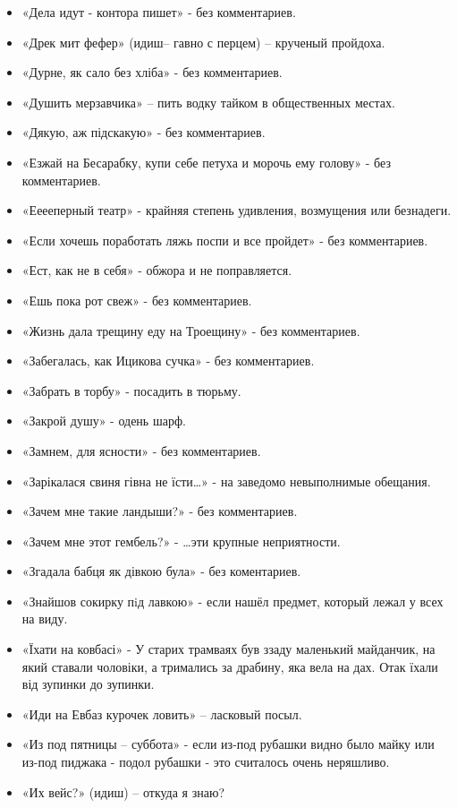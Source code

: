 \begin{itemize}
\item  «Дела идут - контора пишет» - без комментариев.
\item  «Дрек мит фефер» (идиш– гавно с перцем) – крученый пройдоха. 
\item  «Дурне, як сало без хліба» - без комментариев.
\item  «Душить мерзавчика» – пить водку тайком в общественных местах.
\item  «Дякую, аж підскакую» - без комментариев.
\item  «Езжай на Бесарабку, купи себе петуха и морочь ему голову» - без комментариев.
\item  «Ееееперный театр» - крайняя степень удивления, возмущения или безнадеги.
\item  «Если хочешь поработать ляжь поспи и все пройдет» - без комментариев.
\item  «Ест, как не в себя» - обжора и не поправляется.
\item  «Ешь пока рот свеж» - без комментариев.
\item  «Жизнь дала трещину еду на Троещину» - без комментариев.
\item  «Забегалась, как Ицикова сучка» - без комментариев.
\item  «Забрать в торбу» -  посадить в тюрьму.
\item  «Закрой душу» - одень шарф.
\item  «Замнем, для ясности» - без комментариев.
\item  «Зарікалася свиня гівна не їсти…» - на заведомо невыполнимые обещания.
\item  «Зачем мне такие ландыши?» - без комментариев.
\item  «Зачем мне этот гембель?» - …эти крупные неприятности.
\item  «Згадала бабця як дівкою була» - без коментариев.
\item  «Знайшов сокирку пiд лавкою» - если нашёл предмет, который лежал у всех на виду.
\item  «Їхати на ковбасі» - У старих трамваях був ззаду маленький майданчик, на який ставали чоловіки, а тримались за драбину, яка вела на дах. Отак їхали від зупинки до зупинки.
\item  «Иди на Евбаз курочек ловить» – ласковый посыл.
\item  «Из под пятницы – суббота» - если из-под рубашки видно было майку или из-под пиджака - подол рубашки - это считалось очень неряшливо.
\item  «Их вейс?» (идиш) – откуда я знаю?

\end{itemize}
